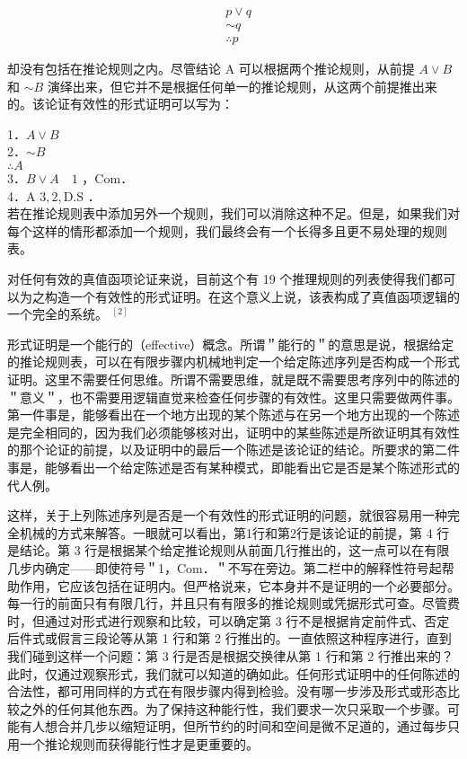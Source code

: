 $$
\begin{aligned}
& p \vee q \\
& \sim q \\
& \therefore p
\end{aligned}
$$

却没有包括在推论规则之内。尽管结论 A 可以根据两个推论规则，从前提 $A \vee B$ 和 $\sim B$ 演绎出来，但它并不是根据任何单一的推论规则，从这两个前提推出来的。该论证有效性的形式证明可以写为：

1．$A \vee B$\\
2．$\sim B$\\
$\therefore A$\\
3．$B \vee A \quad 1$ ，Com．\\
4．A $3,2, \mathrm{D} . \mathrm{S}$ ．\\
若在推论规则表中添加另外一个规则，我们可以消除这种不足。但是，如果我们对每个这样的情形都添加一个规则，我们最终会有一个长得多且更不易处理的规则表。

对任何有效的真值函项论证来说，目前这个有 19 个推理规则的列表使得我们都可以为之构造一个有效性的形式证明。在这个意义上说，该表构成了真值函项逻辑的一个完全的系统。 ${ }^{[2]}$

形式证明是一个能行的（effective）概念。所谓＂能行的＂的意思是说，根据给定的推论规则表，可以在有限步骤内机械地判定一个给定陈述序列是否构成一个形式证明。这里不需要任何思维。所谓不需要思维，就是既不需要思考序列中的陈述的＂意义＂，也不需要用逻辑直觉来检查任何步骤的有效性。这里只需要做两件事。第一件事是，能够看出在一个地方出现的某个陈述与在另一个地方出现的一个陈述是完全相同的，因为我们必须能够核对出，证明中的某些陈述是所欲证明其有效性的那个论证的前提，以及证明中的最后一个陈述是该论证的结论。所要求的第二件事是，能够看出一个给定陈述是否有某种模式，即能看出它是否是某个陈述形式的代人例。

这样，关于上列陈述序列是否是一个有效性的形式证明的问题，就很容易用一种完全机械的方式来解答。一眼就可以看出，第1行和第2行是该论证的前提，第 4 行是结论。第 3 行是根据某个给定推论规则从前面几行推出的，这一点可以在有限几步内确定——即使符号＂1，Com．＂不写在旁边。第二栏中的解释性符号起帮助作用，它应该包括在证明内。但严格说来，它本身并不是证明的一个必要部分。每一行的前面只有有限几行，并且只有有限多的推论规则或凭据形式可查。尽管费时，但通过对形式进行观察和比较，可以确定第 3 行不是根据肯定前件式、否定后件式或假言三段论等从第 1 行和第 2 行推出的。一直依照这种程序进行，直到我们碰到这样一个问题：第 3 行是否是根据交换律从第 1 行和第 2 行推出来的？此时，仅通过观察形式，我们就可以知道的确如此。任何形式证明中的任何陈述的合法性，都可用同样的方式在有限步骤内得到检验。没有哪一步涉及形式或形态比较之外的任何其他东西。为了保持这种能行性，我们要求一次只采取一个步骤。可能有人想合并几步以缩短证明，但所节约的时间和空间是微不足道的，通过每步只用一个推论规则而获得能行性才是更重要的。

